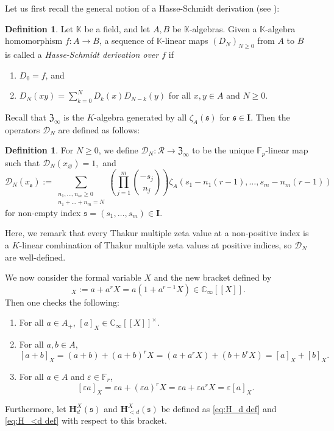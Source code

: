 \documentclass[12pt,reqno]{amsart}
\numberwithin{equation}{section}
\theoremstyle{plain}
\theoremstyle{definition}
\newtheorem{df}[thm]{Definition}
\theoremstyle{remark}
\newcommand{\CC}{\mathbb{C}}
\newcommand{\FF}{\mathbb{F}}
\newcommand{\KK}{\mathbb{K}}
\newcommand{\Dcal}{\mathcal{D}}
\newcommand{\Rcal}{\mathcal{R}}
\newcommand{\mbb}[1]{[\![{#1}]\!]}
\newcommand{\ww}[1]{\mathfrak{#1}}
\renewcommand{\H}{\mathbf{H}}
\newcommand{\Ical}{\mathbf{I}}
\newcommand{\Zcal}{\mathfrak{Z}}
\begin{document}
Let us first recall the general notion of a Hasse-Schmidt derivation (see \cite{Weifeld1965}):

\begin{df}

    Let $\KK$ be a field, and let $A, B$ be $\KK$-algebras. Given a $\KK$-algebra homomorphism $f: A \to B$, a sequence of $\KK$-linear maps $(D_N)_{N \ge 0}$ from $A$ to $B$ is called a \textit{Hasse-Schmidt derivation over $f$} if

    \begin{enumerate}

        \item $D_0 = f$, and

        \item $D_N(xy) = \sum_{k=0}^N D_k(x)D_{N-k}(y)$ for all $x, y \in A$ and $N \geq 0$.

    \end{enumerate}

\end{df}

Recall that $\Zcal_\infty$ is the $K$-algebra generated by all $\zeta_A(\ww{s})$ for $\ww{s}\in\Ical$.  Then the operators $\Dcal_N$ are defined as follows:
\begin{df}\label{df:D_N}
    For $N\geq 0$, we define $\Dcal_N : \Rcal \to \Zcal_\infty$ to be the unique $\FF_p$-linear map such that
    $\Dcal_N(x_{\varnothing})=1,$
    and 
    $$\Dcal_N(x_{\ww{s}}) := \sum_{\substack{n_1, \ldots, n_m \ge 0 \\ n_1 + \dots + n_m = N}} \left( \prod_{j=1}^m \binom{-s_j}{n_j} \right) \zeta_A(s_1-n_1(r-1), \dots, s_m-n_m(r-1))$$
    for non-empty index $\ww{s}=(s_1,\ldots,s_m)\in\Ical$.
\end{df}
Here, we remark that every Thakur multiple zeta value at a non-positive index is a $K$-linear combination of Thakur multiple zeta values at positive indices, so $\Dcal_N$ are well-defined.

We now consider the formal variable $X$ and the new bracket defined by
\begin{equation*}
    [a]_{X} := a + a^r X = a(1 + a^{r-1}X) \in \CC_\infty\mbb{X}.
\end{equation*}
Then one checks the following:
\begin{enumerate}
    \item For all $a\in A_{+}$, $[a]_X\in\CC_\infty\mbb{X}^\times$.
    \item For all \(a,b\in A\),
    $$[a+b]_X=(a+b)+(a+b)^rX=(a+a^rX)+(b+b^rX)=[a]_X+[b]_X.$$
    \item For all $a\in A$ and $\varepsilon\in\FF_r$,
    $$[\varepsilon a]_X=\varepsilon a+(\varepsilon a)^r X=\varepsilon a+\varepsilon a^r X=\varepsilon [a]_X.$$
\end{enumerate}
Furthermore, let $\H_d^X(\ww{s})$ and $\H_{<d}^X(\ww{s})$ be defined as \eqref{eq:H_d def} and \eqref{eq:H_<d def} with respect to this bracket.
\end{document}
